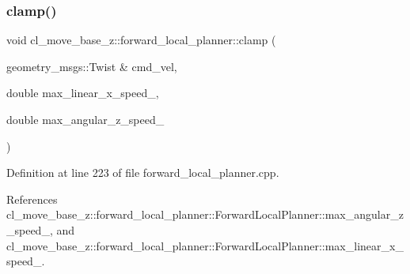 \subsubsection{\texorpdfstring{clamp()}{clamp()}}
{\footnotesize\ttfamily void cl\+\_\+move\+\_\+base\+\_\+z\+::forward\+\_\+local\+\_\+planner\+::clamp (\begin{DoxyParamCaption}\item[{geometry\+\_\+msgs\+::\+Twist \&}]{cmd\+\_\+vel,  }\item[{double}]{max\+\_\+linear\+\_\+x\+\_\+speed\+\_\+,  }\item[{double}]{max\+\_\+angular\+\_\+z\+\_\+speed\+\_\+ }\end{DoxyParamCaption})}



Definition at line 223 of file forward\+\_\+local\+\_\+planner.\+cpp.



References cl\+\_\+move\+\_\+base\+\_\+z\+::forward\+\_\+local\+\_\+planner\+::\+Forward\+Local\+Planner\+::max\+\_\+angular\+\_\+z\+\_\+speed\+\_\+, and cl\+\_\+move\+\_\+base\+\_\+z\+::forward\+\_\+local\+\_\+planner\+::\+Forward\+Local\+Planner\+::max\+\_\+linear\+\_\+x\+\_\+speed\+\_\+.


